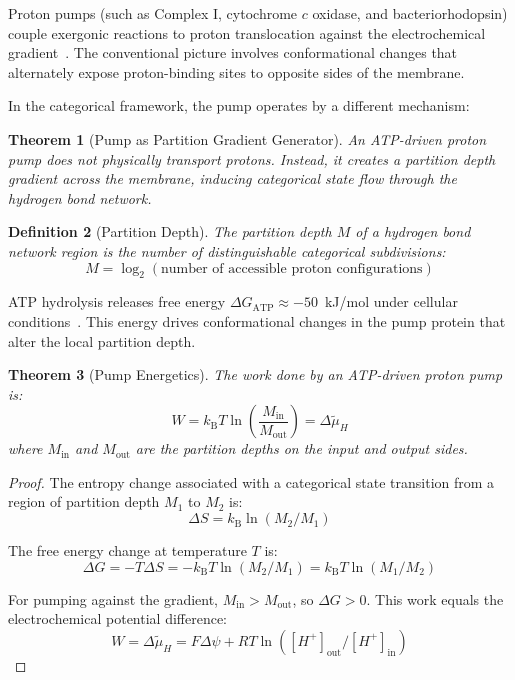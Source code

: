 \documentclass[twocolumn,showpacs,preprintnumbers,amsmath,amssymb,prd]{revtex4-2}
\newtheorem{theorem}{Theorem}[section]
\newtheorem{definition}[theorem]{Definition}
\newcommand{\kB}{k_{\text{B}}}
\begin{document}
Proton pumps (such as Complex I, cytochrome $c$ oxidase, and bacteriorhodopsin) couple exergonic reactions to proton translocation against the electrochemical gradient~\cite{Nicholls2013}. The conventional picture involves conformational changes that alternately expose proton-binding sites to opposite sides of the membrane.

In the categorical framework, the pump operates by a different mechanism:

\begin{theorem}[Pump as Partition Gradient Generator]
\label{thm:pump_mechanism}
An ATP-driven proton pump does not physically transport protons. Instead, it creates a partition depth gradient across the membrane, inducing categorical state flow through the hydrogen bond network.
\end{theorem}

\begin{definition}[Partition Depth]
\label{def:partition_depth}
The partition depth $M$ of a hydrogen bond network region is the number of distinguishable categorical subdivisions:
\begin{equation}
M = \log_2(\text{number of accessible proton configurations})
\label{eq:partition_depth}
\end{equation}
\end{definition}

ATP hydrolysis releases free energy $\Delta G_{\text{ATP}} \approx -50$~kJ/mol under cellular conditions~\cite{Nicholls2013}. This energy drives conformational changes in the pump protein that alter the local partition depth.

\begin{theorem}[Pump Energetics]
\label{thm:pump_energetics}
The work done by an ATP-driven proton pump is:
\begin{equation}
W = \kB T \ln\left(\frac{M_{\text{in}}}{M_{\text{out}}}\right) = \Delta\tilde{\mu}_H
\label{eq:pump_work}
\end{equation}
where $M_{\text{in}}$ and $M_{\text{out}}$ are the partition depths on the input and output sides.
\end{theorem}

\begin{proof}
The entropy change associated with a categorical state transition from a region of partition depth $M_1$ to $M_2$ is:
\begin{equation}
\Delta S = \kB \ln(M_2/M_1)
\label{eq:entropy_change}
\end{equation}

The free energy change at temperature $T$ is:
\begin{equation}
\Delta G = -T\Delta S = -\kB T \ln(M_2/M_1) = \kB T \ln(M_1/M_2)
\label{eq:free_energy_partition}
\end{equation}

For pumping against the gradient, $M_{\text{in}} > M_{\text{out}}$, so $\Delta G > 0$. This work equals the electrochemical potential difference:
\begin{equation}
W = \Delta\tilde{\mu}_H = F\Delta\psi + RT\ln([H^+]_{\text{out}}/[H^+]_{\text{in}})
\end{equation}
\end{proof}
\end{document}
